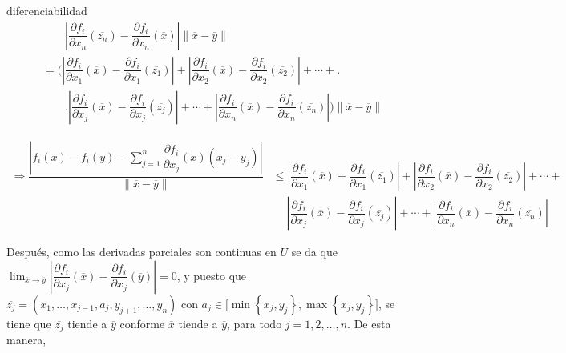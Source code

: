 \documentclass[fleqn, 12pt]{article}
\newenvironment{ejercicio}[1]{\begin{ejer}[breakable, pad at break = 5mm, leftrule = 0.7mm, rightrule = 0.7mm, right = 2mm, left = 2mm, enlarge bottom finally by = 3mm]{}{#1}}{\end{ejer}}
\begin{document}
\begin{ejercicio}{diferenciabilidad}
\begin{equation*}
\begin{split}
				& \qquad \left\lvert \dfrac{\partial f_i}{\partial x_n} (\overline{z_n}) - \dfrac{\partial f_i}{\partial x_n} (\overline{x}) \right\rvert \left\lVert \overline{x} - \overline{y} \right\rVert \\
				&= \Biggl( \left\lvert \dfrac{\partial f_i}{\partial x_1} (\overline{x}) - \dfrac{\partial f_i}{\partial x_1} (\overline{z_1}) \right\rvert + \left\lvert \dfrac{\partial f_i}{\partial x_2} (\overline{x}) - \dfrac{\partial f_i}{\partial x_2} (\overline{z_2}) \right\rvert + \cdots + \Biggr. \\
				& \qquad \Biggl. \left\lvert \dfrac{\partial f_i}{\partial x_j} (\overline{x}) - \dfrac{\partial f_i}{\partial x_j} (\overline{z_j}) \right\rvert + \cdots + \left\lvert \dfrac{\partial f_i}{\partial x_n} (\overline{x}) - \dfrac{\partial f_i}{\partial x_n} (\overline{z_n}) \right\rvert \Biggr) \left\lVert \overline{x} - \overline{y} \right\rVert
			\end{split}
		\end{equation*}

		\begin{equation*}
			\begin{split}
				\Longrightarrow \dfrac{\left\lvert f_i(\overline{x}) - f_i(\overline{y}) - \displaystyle \sum_{j=1}^{n} \dfrac{\partial f_i}{\partial x_j}(\overline{x}) \left( x_j - y_j \right) \right\rvert}{\left\lVert \overline{x} - \overline{y} \right\rVert} &\leq \left\lvert \dfrac{\partial f_i}{\partial x_1} (\overline{x}) - \dfrac{\partial f_i}{\partial x_1} (\overline{z_1}) \right\rvert + \left\lvert \dfrac{\partial f_i}{\partial x_2} (\overline{x}) - \dfrac{\partial f_i}{\partial x_2} (\overline{z_2}) \right\rvert + \cdots + \\
				& \quad \; \left\lvert \dfrac{\partial f_i}{\partial x_j} (\overline{x}) - \dfrac{\partial f_i}{\partial x_j} (\overline{z_j}) \right\rvert + \cdots + \left\lvert \dfrac{\partial f_i}{\partial x_n} (\overline{x}) - \dfrac{\partial f_i}{\partial x_n} (\overline{z_n}) \right\rvert
			\end{split}
		\end{equation*}

		Después, como las derivadas parciales son continuas en $ U $ se da que $ \displaystyle \lim_{\overline{x} \to \overline{y}} \left\lvert \dfrac{\partial f_i}{\partial x_j} (\overline{x}) - \dfrac{\partial f_i}{\partial x_j} (\overline{y}) \right\rvert = 0 $, y puesto que $ \overline{z_j} = (x_1, \ldots, x_{j-1}, a_j, y_{j+1}, \ldots, y_n) $ con $ a_j \in \bigl[ \min \left\lbrace x_j, y_j \right\rbrace, \max \left\lbrace x_j, y_j \right\rbrace \bigr] $, se tiene que $ \overline{z_j} $ tiende a $ \overline{y} $ conforme $ \overline{x} $ tiende a $ \overline{y} $, para todo $ j = 1, 2, \ldots, n $. De esta manera, 


\end{ejercicio}
\end{document}
